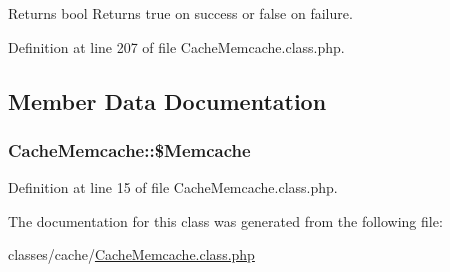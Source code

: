 \begin{DoxyReturn}{Returns}
bool Returns true on success or false on failure. 
\end{DoxyReturn}


Definition at line 207 of file Cache\+Memcache.\+class.\+php.



\subsection{Member Data Documentation}
\hypertarget{classCacheMemcache_a56ac8c11dec3851aee654babe49d20f8}{}
\subsubsection[{\$\+Memcache}]{\setlength{\rightskip}{0pt plus 5cm}Cache\+Memcache\+::\$\+Memcache}\label{classCacheMemcache_a56ac8c11dec3851aee654babe49d20f8}


Definition at line 15 of file Cache\+Memcache.\+class.\+php.



The documentation for this class was generated from the following file\+:\begin{DoxyCompactItemize}
\item 
classes/cache/\hyperlink{CacheMemcache_8class_8php}{Cache\+Memcache.\+class.\+php}\end{DoxyCompactItemize}
